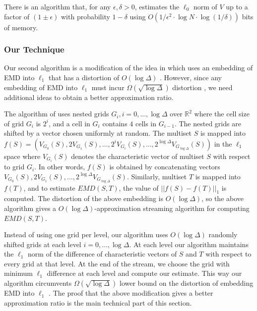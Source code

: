 \documentclass[oribibl]{llncs}
\begin{document}
\begin{fact}\label{fact2}
There is an algorithm that, for any $\epsilon,\delta >0$, estimates the $\ell_0$
norm of $V$ up to a factor of $(1\pm\epsilon)$ with probability $1-\delta$
using $O(1/\epsilon^2\cdot \log N\cdot \log(1/\delta))$ bits of memory.
\end{fact}

\subsubsection{Our Technique}
Our second algorithm is a modification of the idea in \cite{ind04}
which uses an embedding of EMD into $\ell_1$ that has a distortion of
$O(\log\Delta)$ \cite{thaper, charikar}.
However, since any embedding of EMD into $\ell_1$ must
incur $\Omega(\sqrt{\log\Delta})$ distortion \cite{naor}, we need additional
ideas to obtain a better approximation ratio.

The algorithm of \cite{ind04} uses nested grids
$G_i, i = 0, \ldots, \log\Delta$ over $\mathbb{R}^2$ where the cell size of
grid $G_i$ is $2^i$, and a cell in $G_i$ contains $4$ cells in
$G_{i-1}$. The nested grids are shifted by a vector chosen uniformly at random.
The multiset $S$ is mapped into 
$f(S) = (V_{G_0}(S), 2V_{G_1}(S),\ldots,2^iV_{G_i}(S),\ldots,2^{\log\Delta}V_{G_{\log\Delta}}(S))$
in the $\ell_1$ space where
$V_{G_i}(S)$ denotes the characteristic vector of multiset $S$ with respect
to grid $G_i$. In other words, $f(S)$ is obtained by concatenating vectors
$V_{G_0}(S), 2V_{G_1}(S),\ldots,2^{\log\Delta}V_{G_{\log\Delta}}(S)$.
Similarly, multiset $T$ is mapped into $f(T)$, and 
to estimate $EMD(S,T)$, the value of $||f(S) - f(T)||_1$ is computed.
The distortion of the above embedding is $O(\log\Delta)$, so 
the above algorithm gives a $O(\log\Delta)$-approximation streaming algorithm
for computing $EMD(S,T)$.

Instead of using one grid per level, our algorithm uses
$O(\log\Delta)$ randomly shifted grids at each level
$i = 0, \ldots, \log\Delta$. At each level our algorithm maintains the
$\ell_1$ norm of the difference of characteristic vectors of $S$ and $T$ with
respect to every grid at that level. At the end of the stream, we choose
the grid with minimum $\ell_1$ difference at each level and compute our estimate.
This way our algorithm circumvents $\Omega(\sqrt{\log\Delta})$ lower bound
on the distortion of embedding EMD into $\ell_1$ \cite{naor}.
The proof that the above modification gives a better approximation ratio is the
main technical part of this section.
\end{document}
